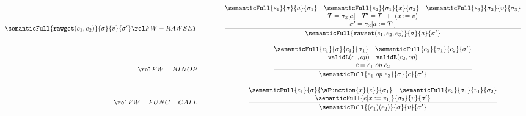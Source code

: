 \begin{figure}[P]
\[\begin{array}{r@{\qquad\qquad}c}
{}{
  \semanticFull {{\tt rawget}(e_1,e_2)} {\sigma}   {v} {\sigma'}
}
\ssrule{FW-RAWSET}{
  \semanticFull{e_1}{\sigma}{a}{\sigma_1} \quad
  \semanticFull{e_2}{\sigma_1}{x}{\sigma_2} \quad
  \semanticFull{e_3}{\sigma_2}{v}{\sigma_3} \\
  T = \sigma_3[a] \quad
  T' = T~+~(x := v) \\
  \sigma' = \sigma_3[a:=T']
}{
  \semanticFull{{\tt rawset}(e_1,e_2,e_3)}{\sigma}{a}{\sigma'}
}
\ssrule{FW-BINOP}{
  \semanticFull{e_1}{\sigma}{c_1}{\sigma_1} \quad
  \semanticFull{e_2}{\sigma_1}{c_2}{\sigma'} \\
  {\tt validL}(c_1, op) \quad
  {\tt validR}(c_2, op) \\
  c = c_1 ~op~ c_2
}{
  \semanticFull{e_1 ~op~ e_2}{\sigma}{c}{\sigma'}
}
\ssrule{FW-FUNC-CALL}{
  \semanticFull{e_1}{\sigma}{\aFunction{x}{e}}{\sigma_1} \quad
  \semanticFull{e_2}{\sigma_1}{v_1}{\sigma_2} \\
  \semanticFull{e[x:=v_1]}{\sigma_2}{v}{\sigma'} 
}{
  \semanticFull{(e_1)(e_2)}{\sigma}{v}{\sigma'} 
}
\end{array}
\]
\end{figure}
